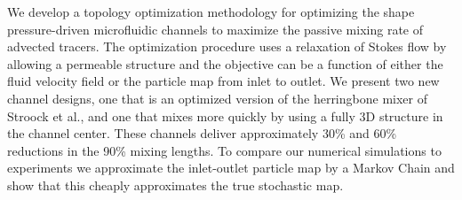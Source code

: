 %
%

We develop a topology optimization methodology for optimizing the
shape pressure-driven microfluidic channels to maximize the passive
mixing rate of advected tracers. The optimization procedure uses a
relaxation of Stokes flow by allowing a permeable structure and the
objective can be a function of either the fluid velocity field or the
particle map from inlet to outlet. We present two new channel designs,
one that is an optimized version of the herringbone mixer of Stroock
et al., and one that mixes more quickly by using a fully 3D structure
in the channel center. These channels deliver approximately 30\% and
60\% reductions in the 90\% mixing lengths. To compare our numerical
simulations to experiments we approximate the inlet-outlet particle
map by a Markov Chain and show that this cheaply approximates the true
stochastic map.

